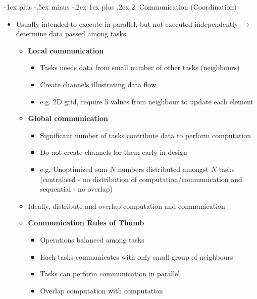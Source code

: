 \documentclass[10pt,landscape]{article}
\makeatletter
\newcommand{\subsubsubsection}{\@startsection{subsubsection}{3}{0mm}%
                                {-1ex plus -.5ex minus -.2ex}%
                                {1ex plus .2ex}%
                                {\normalfont\scriptsize\bfseries}}
\makeatother
\begin{document}
\begin{multicols*}{3}
\subsubsubsection{2. Communication (Coordination)}
\begin{itemize}[topsep=0pt,noitemsep,wide=0pt, leftmargin=\dimexpr{} + 2\relax]
    \item Usually intended to execute in parallel, but not executed independently $\rightarrow$ determine data passed among tasks
    \begin{itemize}[topsep=0pt,noitemsep,wide=0pt, leftmargin=\dimexpr{} + 2\relax]
        \item \textbf{Local communication}
        \begin{itemize}[topsep=0pt,noitemsep,wide=0pt, leftmargin=\dimexpr{} + 2\relax]
            \item Tasks needs data from small number of other tasks (neighbours)
            \item Create channels illustrating data flow
            \item e.g. 2D grid, require 5 values from neighbour to update each element
        \end{itemize}
        \item \textbf{Global communication}
        \begin{itemize}[topsep=0pt,noitemsep,wide=0pt, leftmargin=\dimexpr{} + 2\relax]
            \item Significant number of tasks contribute data to perform computation
            \item Do not create channels for them early in design
            \item e.g. Unoptimized sum $N$ numbers distributed amongst $N$ tasks (centralised - no distribution of computation/communication and sequential - no overlap)
        \end{itemize}
        \item Ideally, distribute and overlap computation and communication
        \item \textbf{Communication Rules of Thumb}
        \begin{itemize}[topsep=0pt,noitemsep,wide=0pt, leftmargin=\dimexpr{} + 2\relax]
            \item Operations balanced among tasks
            \item Each tasks communicates with only small group of neighbours
            \item Tasks can perform communication in parallel
            \item Overlap computation with computation
        \end{itemize}
    \end{itemize}
\end{itemize}


\end{multicols*}
\end{document}
